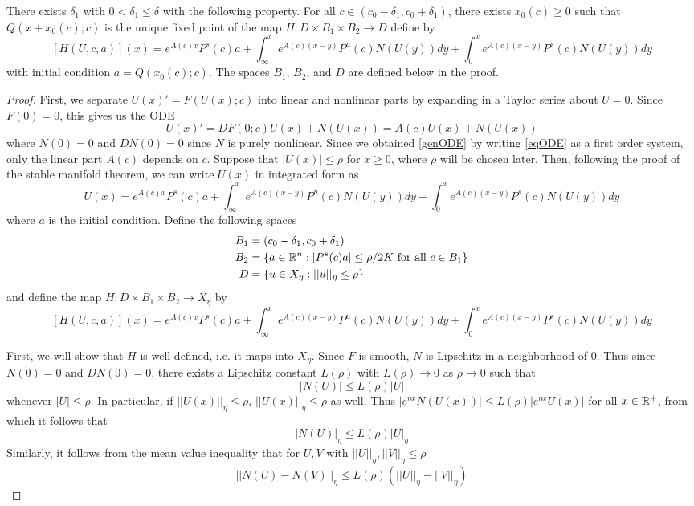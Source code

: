 \documentclass[thesis.tex]{subfiles}
\begin{document}
\begin{lemma}\label{Hcontractionlemma}
There exists $\delta_1$ with $0 < \delta_1 \leq \delta$ with the following property. For all $c \in (c_0 - \delta_1, c_0 + \delta_1)$, there exists $x_0(c) \geq 0$ such that $Q(x + x_0(c); c)$ is the unique fixed point of the map $H: D \times B_1 \times B_2 \rightarrow D$ define by
\begin{equation}\label{defH}
[H(U, c, a)](x) = e^{A(c)x} P^s(c) a + \int_\infty^x e^{A(c)(x - y)}P^u(c) N(U(y))dy + \int_0^x e^{A(c)(x - y)}P^s(c) N(U(y))dy
\end{equation}
with initial condition $a = Q(x_0(c); c)$. The spaces $B_1$, $B_2$, and $D$ are defined below in the proof.

\begin{proof}
First, we separate $U(x)' = F(U(x); c)$ into linear and nonlinear parts by expanding in a Taylor series about $U = 0$. Since $F(0) = 0$, this gives us the ODE
\[
U(x)' = DF(0; c)U(x) + N(U(x)) = A(c)U(x) + N(U(x))
\] 
where $N(0) = 0$ and $DN(0) = 0$ since $N$ is purely nonlinear. Since we obtained \eqref{genODE} by writing \eqref{eqODE} as a first order system, only the linear part $A(c)$ depends on $c$.
Suppose that $|U(x)| \leq \rho$ for $x \geq 0$, where $\rho$ will be chosen later. Then, following the proof of the stable manifold theorem, we can write $U(x)$ in integrated form as 
\[
U(x) = e^{A(c)x} P^s(c) a + \int_\infty^x e^{A(c)(x - y)}P^u(c) N(U(y))dy + \int_0^x e^{A(c)(x - y)}P^s(c) N(U(y))dy
\]
where $a$ is the initial condition. Define the following spaces
\begin{align*}
B_1 &= (c_0 - \delta_1, c_0 + \delta_1) \\
B_2 &= \{ a \in \mathbb{R}^n : |P^s(c) a| \leq \rho/2K \text{ for all } c \in B_1\} \\
D &= \{ u \in X_\eta : ||u||_\eta \leq \rho \}
\end{align*}
and define the map $H: D \times B_1 \times B_2 \rightarrow X_\eta$ by
\begin{equation}\label{defH}
[H(U, c, a)](x) = e^{A(c)x} P^s(c) a + \int_\infty^x e^{A(c)(x - y)}P^u(c) N(U(y))dy + \int_0^x e^{A(c)(x - y)}P^s(c) N(U(y))dy
\end{equation}

First, we will show that $H$ is well-defined, i.e. it maps into $X_\eta$. Since $F$ is smooth, $N$ is Lipschitz in a neighborhood of 0. Thus since $N(0) = 0$ and $DN(0) = 0$, there exists a Lipschitz constant $L(\rho)$ with $L(\rho) \rightarrow 0$ as $\rho \rightarrow 0$ such that 
\[
|N(U)| \leq L(\rho)|U|
\]
whenever $|U| \leq \rho$. In particular, if $||U(x)||_\eta \leq \rho$, $||U(x)||_\eta \leq \rho$ as well. Thus $|e^{\eta x} N(U(x))| \leq L(\rho)|e^{\eta x}U(x)|$ for all $x \in \mathbb{R}^+$, from which it follows that 
\begin{equation}\label{LrhoNU}
|N(U)|_\eta \leq L(\rho)|U|_\eta
\end{equation}
Similarly, it follows from the mean value inequality that for $U, V$ with $||U||_\eta, ||V||_\eta \leq \rho$
\begin{equation}\label{NUlip}
||N(U) - N(V)||_\eta \leq L(\rho)(||U||_\eta - ||V||_\eta) 
\end{equation}


\end{proof}
\end{lemma}
\end{document}
